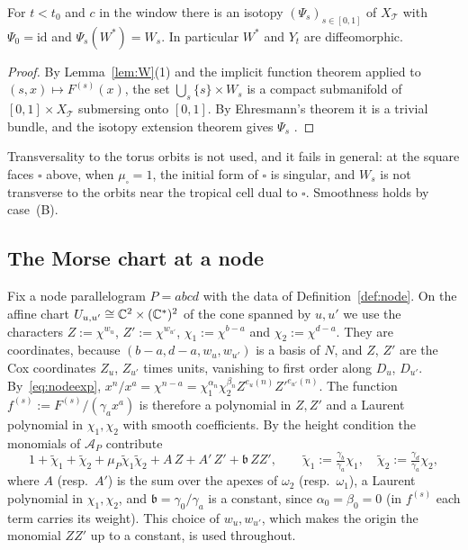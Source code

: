 \begin{proposition}\label{prop:isotopy}
For $t<t_0$ and $c$ in the window there is an isotopy $(\Psi_s)_{s\in[0,1]}$ of $X_{\mathcal T}$ with $\Psi_0=\mathrm{id}$
and $\Psi_s(W^*)=W_s$. In particular $W^*$ and $Y_t$ are diffeomorphic.
\end{proposition}

\begin{proof}
By Lemma~\ref{lem:W}(1) and the implicit function theorem applied to $(s,x)\mapsto F^{(s)}(x)$, the set
$\bigcup_s\{s\}\times W_s$ is a compact submanifold of $[0,1]\times X_{\mathcal T}$ submersing onto $[0,1]$. By Ehresmann's
theorem it is a trivial bundle, and the isotopy extension theorem gives $\Psi_s$ \cite[Ch.~8]{Hirsch}.
\end{proof}

Transversality to the torus orbits is not used, and it fails in general: at the square faces $\square$ above, when
$\mu_\square=1$, the initial form of $\square$ is singular, and $W_s$ is not transverse to the orbits near the tropical
cell dual to $\square$. Smoothness holds by case~(B).

\subsection{The Morse chart at a node}\label{ssec:morse}

Fix a node parallelogram $P=abcd$ with the data of Definition~\ref{def:node}. On the affine chart
$U_{u,u'}\cong\mathbb C^2\times(\mathbb C^*)^2$ of the cone spanned by $u,u'$ we use the characters $Z:=\chi^{w_u}$,
$Z':=\chi^{w_{u'}}$, $\chi_1:=\chi^{b-a}$ and $\chi_2:=\chi^{d-a}$. They are coordinates, because
$(b-a,d-a,w_u,w_{u'})$ is a basis of $N$, and $Z$, $Z'$ are the Cox coordinates $Z_u$, $Z_{u'}$ times units, vanishing to
first order along $D_u$, $D_{u'}$. By~\eqref{eq:nodeexp},
$x^n/x^a=\chi^{n-a}=\chi_1^{\alpha_n}\chi_2^{\beta_n}Z^{e_u(n)}Z'^{e_{u'}(n)}$. The function $f^{(s)}:=F^{(s)}/(\gamma_ax^a)$
is therefore a polynomial in $Z,Z'$ and a Laurent polynomial in $\chi_1,\chi_2$ with smooth coefficients. By the height
condition the monomials of $\mathcal A_P$ contribute
\[
1+\tilde\chi_1+\tilde\chi_2+\mu_P\tilde\chi_1\tilde\chi_2+A\,Z+A'\,Z'+\mathfrak b\,ZZ',\qquad
\tilde\chi_1:=\tfrac{\gamma_b}{\gamma_a}\chi_1,\quad \tilde\chi_2:=\tfrac{\gamma_d}{\gamma_a}\chi_2,
\]
where $A$ (resp.\ $A'$) is the sum over the apexes of $\omega_2$ (resp.\ $\omega_1$), a Laurent polynomial in
$\chi_1,\chi_2$, and $\mathfrak b=\gamma_0/\gamma_a$ is a constant, since $\alpha_0=\beta_0=0$ (in $f^{(s)}$ each term
carries its weight). This choice of $w_u,w_{u'}$, which makes the origin the monomial $ZZ'$ up to a constant, is used
throughout.

